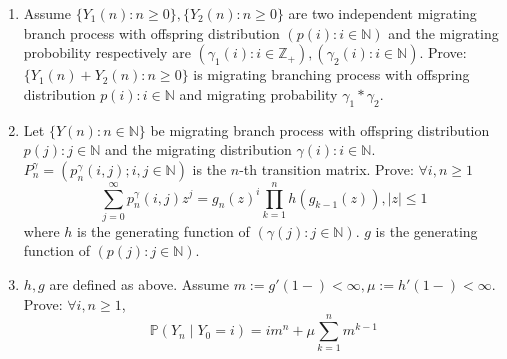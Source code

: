 \documentclass[../main]{subfiles}
\begin{document}
\begin{problem}\label{pro:1}
  \begin{enumerate}
    \item Assume \(\{Y_1(n):n \geq 0\}, \{Y_2(n):n \geq 0\}\) are two independent migrating branch process with
      offspring distribution \((p(i):i \in \mathbb{N})\) and the migrating probobility respectively
      are \((\gamma_1(i): i \in \mathbb{Z}_{+}),(\gamma_2(i): i \in \mathbb{N})\).
      Prove: \(\{Y_1(n )+ Y_2(n): n \geq 0\}\) is migrating branching process with
      offspring distribution \(p(i): i \in \mathbb{N}\)
      and migrating probability \(\gamma_1 * \gamma_2\).
    \item Let \(\{Y(n): n \in \mathbb{N}\}\) be migrating branch process with offspring distribution \(p(j): j \in \mathbb{N}\)
      and the migrating distribution \(\gamma(i): i \in \mathbb{N}\).
      \(P_n^\gamma=(p_n^\gamma (i,j); i,j \in \mathbb{N})\) is the \(n\)-th transition matrix.
      Prove: \(\forall i,n \geq 1\)
      \[
        \sum_{j=0}^{\infty} p_n^\gamma(i,j)z^j = g_n(z)^i \prod_{k=1}^{n} h(g_{k-1}(z)), |z| \leq 1
      \]
      where \(h\) is the generating function of \((\gamma(j): j \in \mathbb{N})\).
      \(g\) is the generating function of \((p(j): j \in \mathbb{N})\).
    \item \(h,g\) are defined as above. Assume \(m :=g'(1-) < \infty, \mu:=h'(1-) < \infty\).
      Prove: \(\forall i,n \geq 1\), \[
        \mathbb{P}(Y_n \mid Y_0 =i)=im^n + \mu \sum_{k=1}^{n} m^{k-1}
      \]
  \end{enumerate}
\end{problem}
\end{document}
